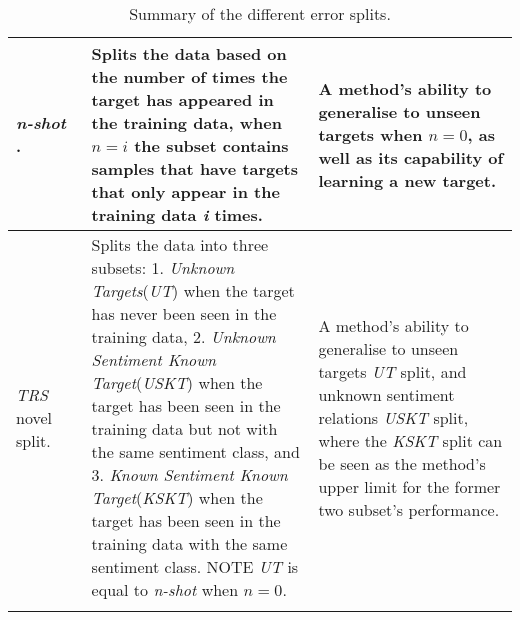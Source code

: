 \begin{longtable}{|p{0.15\linewidth}|p{0.45\linewidth}|p{0.4\linewidth}|}
\hline
\textit{n-shot} \citep{yang2018multi}. & Splits the data based on the number of times the target has appeared in the training data, when $n=i$ the subset contains samples that have targets that only appear in the training data \textit{i} times. & A method's ability to generalise to unseen targets when $n=0$, as well as its capability of learning a new target. \\
\hline
\textit{TRS} novel split. & Splits the data into three subsets: 1. \textit{Unknown Targets}(\textit{UT}) when the target has never been seen in the training data, 2. \textit{Unknown Sentiment Known Target}(\textit{USKT}) when the target has been seen in the training data but not with the same sentiment class, and 3. \textit{Known Sentiment Known Target}(\textit{KSKT}) when the target has been seen in the training data with the same sentiment class. NOTE \textit{UT} is equal to \textit{n-shot} when $n=0$. & A method's ability to generalise to unseen targets \textit{UT} split, and unknown sentiment relations \textit{USKT} split, where the \textit{KSKT} split can be seen as the method's upper limit for the former two subset's performance. \\
\hline
\caption{Summary of the different error splits.}
\label{table:aug_error_split_summary}
\end{longtable}